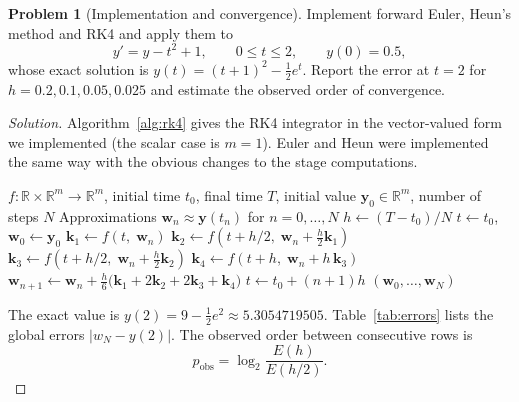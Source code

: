 \documentclass[11pt]{article}
\newcommand{\R}{\mathbb{R}}
\theoremstyle{definition}
\newtheorem{problem}{Problem}
\newenvironment{solution}{\begin{proof}[Solution]}{\end{proof}}
\begin{document}
\begin{problem}[Implementation and convergence]\label{prob:impl}
Implement forward Euler, Heun's method and RK4 and apply them to
\begin{equation}\label{eq:test}
  y' = y - t^2 + 1, \qquad 0 \le t \le 2, \qquad y(0) = 0.5,
\end{equation}
whose exact solution is $y(t) = (t+1)^2 - \tfrac12 e^{t}$. Report the error at $t = 2$ for $h = 0.2, 0.1, 0.05, 0.025$ and estimate the observed order of convergence.
\end{problem}

\begin{solution}
Algorithm~\ref{alg:rk4} gives the RK4 integrator in the vector-valued form we implemented (the scalar case is $m = 1$). Euler and Heun were implemented the same way with the obvious changes to the stage computations.

\begin{algorithm}[ht]
  \caption{Classical RK4 with fixed step size}
  \label{alg:rk4}
  \begin{algorithmic}[1]
    \Require $f:\R\times\R^m\to\R^m$, initial time $t_0$, final time $T$, initial value $\mathbf{y}_0\in\R^m$, number of steps $N$
    \Ensure Approximations $\mathbf{w}_n \approx \mathbf{y}(t_n)$ for $n = 0,\dots,N$
    \State $h \gets (T - t_0)/N$
    \State $t \gets t_0$, \quad $\mathbf{w}_0 \gets \mathbf{y}_0$
      \State $\mathbf{k}_1 \gets f(t,\; \mathbf{w}_n)$
      \State $\mathbf{k}_2 \gets f(t + h/2,\; \mathbf{w}_n + \tfrac{h}{2}\mathbf{k}_1)$
      \State $\mathbf{k}_3 \gets f(t + h/2,\; \mathbf{w}_n + \tfrac{h}{2}\mathbf{k}_2)$
      \State $\mathbf{k}_4 \gets f(t + h,\; \mathbf{w}_n + h\,\mathbf{k}_3)$
      \State $\mathbf{w}_{n+1} \gets \mathbf{w}_n + \tfrac{h}{6}\bigl(\mathbf{k}_1 + 2\mathbf{k}_2 + 2\mathbf{k}_3 + \mathbf{k}_4\bigr)$
      \State $t \gets t_0 + (n+1)h$ 
    \EndFor
    \State \Return $(\mathbf{w}_0, \dots, \mathbf{w}_N)$
  \end{algorithmic}
\end{algorithm}

The exact value is $y(2) = 9 - \tfrac12 e^2 \approx 5.3054719505$. Table~\ref{tab:errors} lists the global errors $|w_N - y(2)|$. The observed order between consecutive rows is
\[
  p_{\text{obs}} = \log_2 \frac{E(h)}{E(h/2)}.
\]


\end{solution}
\end{document}

